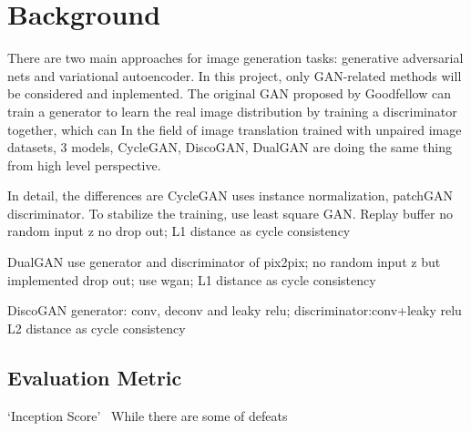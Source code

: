 \chapter{Background}\label{Ch:Background}
There are two main approaches for image generation tasks: generative adversarial nets and variational autoencoder. In this project, only GAN-related methods will be considered and inplemented.
The original GAN proposed by Goodfellow can train a generator to learn the real image distribution by training a discriminator together, which can 
In the field of image translation trained with unpaired image datasets, 3 models, CycleGAN, DiscoGAN, DualGAN are doing the same thing %
from high level perspective.

In detail, the differences are
CycleGAN uses instance normalization, patchGAN discriminator. To stabilize the training, use least square GAN. Replay buffer
              no random input z no drop out; L1 distance as cycle consistency

DualGAN use generator and discriminator of pix2pix; no random input z but implemented drop out; use wgan;
             L1 distance as cycle consistency

DiscoGAN generator: conv, deconv and leaky relu; discriminator:conv+leaky relu  L2 distance as cycle consistency


\section{Evaluation Metric}

`Inception Score'~\cite{improved_tech_GANs}
While there are some of defeats ~\cite{note_on_inception}




